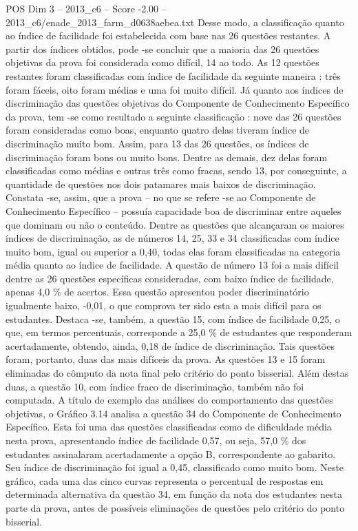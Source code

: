 \begin{textsample}{POS Dim 3 – 2013\_c6 – Score -2.00 – 2013\_c6/enade\_2013\_farm\_d0638aebea.txt}
Desse modo, a classificação quanto ao índice de facilidade foi estabelecida com base nas 26 questões restantes.
A partir dos índices obtidos, pode -se concluir que a maioria das 26 questões objetivas da prova foi considerada como difícil, 14 ao todo.
As 12 questões restantes foram classificadas com índice de facilidade da seguinte maneira : três foram fáceis, oito foram médias e uma foi muito difícil.
Já quanto aos índices de discriminação das questões objetivas do Componente de Conhecimento Específico da prova, tem -se como resultado a seguinte classificação : nove das 26 questões foram consideradas como boas, enquanto quatro delas tiveram índice de discriminação muito bom.
Assim, para 13 das 26 questões, os índices de discriminação foram bons ou muito bons.
Dentre as demais, dez delas foram classificadas como médias e outras três como fracas, sendo 13, por conseguinte, a quantidade de questões nos dois patamares mais baixos de discriminação.
Constata -se, assim, que a prova – no que se refere -se ao Componente de Conhecimento Específico – possuía capacidade boa de discriminar entre aqueles que dominam ou não o conteúdo.
Dentre as questões que alcançaram os maiores índices de discriminação, as de números 14, 25, 33 e 34 classificadas com índice muito bom, igual ou superior a 0,40, todas elas foram classificadas na categoria média quanto ao índice de facilidade.
A questão de número 13 foi a mais difícil dentre as 26 questões específicas consideradas, com baixo índice de facilidade, apenas 4,0 \% de acertos.
Essa questão apresentou poder discriminatório igualmente baixo, -0,01, o que comprova ter sido esta a mais difícil para os estudantes.
Destaca -se, também, a questão 15, com índice de facilidade 0,25, o que, em termos percentuais, corresponde a 25,0 \% de estudantes que responderam acertadamente, obtendo, ainda, 0,18 de índice de discriminação.
Tais questões foram, portanto, duas das mais difíceis da prova.
As questões 13 e 15 foram eliminadas do cômputo da nota final pelo critério do ponto bisserial.
Além destas duas, a questão 10, com índice fraco de discriminação, também não foi computada.
A título de exemplo das análises do comportamento das questões objetivas, o Gráfico 3.14 analisa a questão 34 do Componente de Conhecimento Específico.
Esta foi uma das questões classificadas como de dificuldade média nesta prova, apresentando índice de facilidade 0,57, ou seja, 57,0 \% dos estudantes assinalaram acertadamente a opção B, correspondente ao gabarito.
Seu índice de discriminação foi igual a 0,45, classificado como muito bom.
Neste gráfico, cada uma das cinco curvas representa o percentual de respostas em determinada alternativa da questão 34, em função da nota dos estudantes nesta parte da prova, antes de possíveis eliminações de questões pelo critério do ponto bisserial.

\end{textsample}
